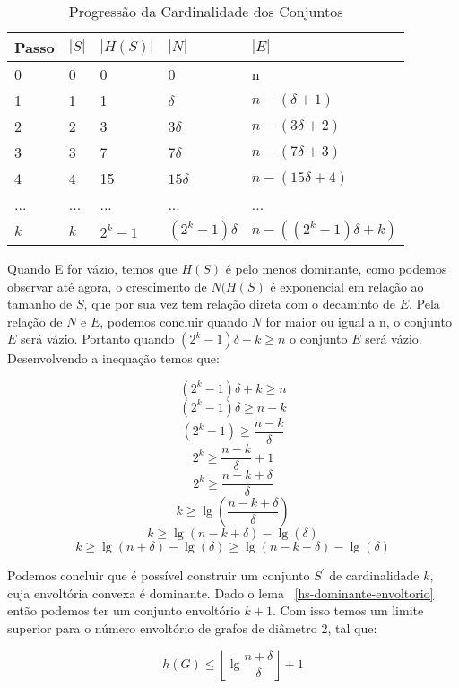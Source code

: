\begin{table}[h]
\centering
\begin{tabular}{l|l|l|l|l}
Passo & $|S|$  & $|H(S)|$ & $|N|$ & $|E|$  \\ \hline
  0 & 0    & 0     & 0             & n                    \\
  1 & 1    & 1     & $\delta$      & $n - (\delta + 1)  $ \\
  2 & 2    & 3     & $3\delta$     & $n - (3\delta + 2) $ \\
  3 & 3    & 7     & $7\delta$     & $n - (7\delta + 3) $ \\
  4 & 4    & 15    & $15\delta$    & $n - (15\delta + 4)$ \\
... & ...& ...      & ...           & ...                  \\
  $k$ & $k$    & $2^k-1$& $(2^k-1)\delta$ & $n - ((2^k-1)\delta + k)$ \\
\end{tabular}
\caption{Progressão da Cardinalidade dos Conjuntos}
\label{tab:crescimento-envoltoria-dominante}
\end{table}

Quando E for vázio, temos que $H(S)$ é pelo menos dominante, como podemos observar até agora, o crescimento de $N(H(S)$ é exponencial em relação ao tamanho de $S$, que por sua vez tem relação direta com o decaminto de $E$. 
Pela relação de $N$ e $E$, podemos concluir quando $N$ for maior ou igual a n, o conjunto $E$ será vázio. Portanto quando $(2^k-1)\delta + k \ge n$ o conjunto $E$ será vázio. Desenvolvendo a inequação temos que:

$$ (2^k-1)\delta + k \ge n $$
$$ (2^k-1)\delta \ge n -k $$
$$ (2^k-1) \ge \frac{n-k}{\delta} $$
$$ 2^k \ge \frac{n-k}{\delta} +1 $$
$$ 2^k \ge \frac{n-k+\delta}{\delta} $$
$$ k \ge \lg{(\frac{n-k+\delta}{\delta})} $$
$$ k \ge \lg{(n-k+\delta)} - \lg{(\delta)} $$
$$ k \ge \lg{(n+\delta)} - \lg{(\delta)}  \ge \lg{(n-k+\delta)} - \lg{(\delta)} $$

Podemos concluir que é possível construir um conjunto $S^\prime$ de cardinalidade $k$, cuja envoltória convexa é dominante. Dado o lema ~\ref{hs-dominante-envoltorio} então podemos ter um conjunto envoltório $k+1$. Com isso temos um limite superior para o número envoltório de grafos de diâmetro 2, tal que:

$$ h(G) \le \left\lfloor \lg{ \frac{n+\delta}{\delta} } \right\rfloor + 1  $$


